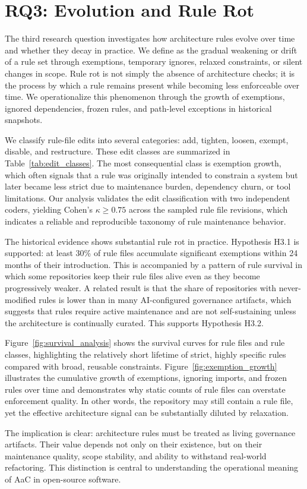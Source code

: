 \section{RQ3: Evolution and Rule Rot}\label{sec:rq3}

The third research question investigates how architecture rules evolve over time and whether they decay in practice. We define \rrot as the gradual weakening or drift of a rule set through exemptions, temporary ignores, relaxed constraints, or silent changes in scope. Rule rot is not simply the absence of architecture checks; it is the process by which a rule remains present while becoming less enforceable over time. We operationalize this phenomenon through the growth of exemptions, ignored dependencies, frozen rules, and path-level exceptions in historical snapshots.

We classify rule-file edits into several categories: add, tighten, loosen, exempt, disable, and restructure. These edit classes are summarized in Table~\ref{tab:edit_classes}. The most consequential class is exemption growth, which often signals that a rule was originally intended to constrain a system but later became less strict due to maintenance burden, dependency churn, or tool limitations. Our analysis validates the edit classification with two independent coders, yielding Cohen's $\kappa \ge 0.75$ across the sampled rule file revisions, which indicates a reliable and reproducible taxonomy of rule maintenance behavior.

The historical evidence shows substantial rule rot in practice. Hypothesis H3.1 is supported: at least 30\% of rule files accumulate significant exemptions within 24 months of their introduction. This is accompanied by a pattern of rule survival in which some repositories keep their rule files alive even as they become progressively weaker. A related result is that the share of repositories with never-modified rules is lower than in many AI-configured governance artifacts, which suggests that rules require active maintenance and are not self-sustaining unless the architecture is continually curated. This supports Hypothesis H3.2.

Figure~\ref{fig:survival_analysis} shows the survival curves for rule files and rule classes, highlighting the relatively short lifetime of strict, highly specific rules compared with broad, reusable constraints. Figure~\ref{fig:exemption_growth} illustrates the cumulative growth of exemptions, ignoring imports, and frozen rules over time and demonstrates why static counts of rule files can overstate enforcement quality. In other words, the repository may still contain a rule file, yet the effective architecture signal can be substantially diluted by relaxation.

The implication is clear: architecture rules must be treated as living governance artifacts. Their value depends not only on their existence, but on their maintenance quality, scope stability, and ability to withstand real-world refactoring. This distinction is central to understanding the operational meaning of AaC in open-source software.





